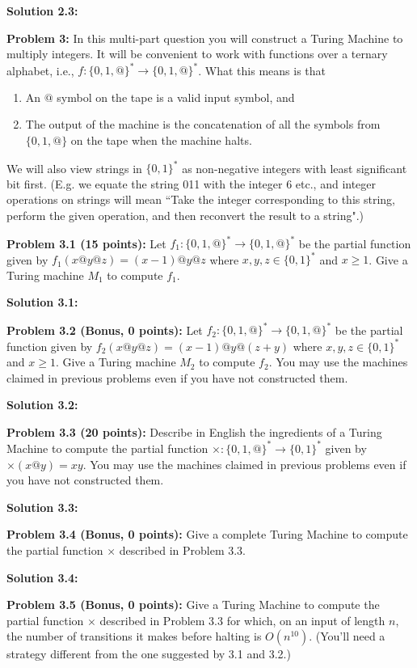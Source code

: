 \documentclass[11pt]{article}
\begin{document}
\textbf{Solution 2.3:} 


\textbf{Problem 3:} In this multi-part question you will construct a Turing Machine to multiply integers. It will be convenient to work with functions over a ternary alphabet, i.e., $f:\{0,1,@\}^* \to  \{0,1,@\}^*$. What this means is that
\begin{enumerate}
\item An $@$ symbol on the tape is a valid input symbol, and 
\item The output of the machine is the concatenation of all the symbols from $\{0,1,@\}$ on the tape when the machine halts. 
\end{enumerate}
We will also view strings in $\{0,1\}^*$ as non-negative integers with least significant bit first. (E.g. we equate the string 011 with the integer 6 etc., and integer operations on strings will mean ``Take the integer corresponding to this string, perform the given operation, and then reconvert the result to a string".)

\textbf{Problem 3.1 (15 points):} Let $f_1:\{0,1,@\}^* \to  \{0,1,@\}^*$ be the partial function given by $f_1(x@y@z) = (x-1) @ y @ z$ where $x,y,z \in \{0,1\}^*$ and $x \ge 1$. Give a Turing machine $M_1$ to compute $f_1$.

\textbf{Solution 3.1:} 

\textbf{Problem 3.2 (Bonus, 0 points):} Let $f_2:\{0,1,@\}^* \to  \{0,1,@\}^*$ be the partial function given by $f_2(x@y@z) = (x-1) @ y @ (z + y)$ where $x,y,z\in \{0,1\}^*$ and $x \ge 1$. Give a Turing machine $M_2$ to compute $f_2$. You may use the machines claimed in previous problems even if you have not constructed them. 

\textbf{Solution 3.2:} 

\textbf{Problem 3.3 (20 points):} Describe in English the ingredients of a Turing Machine to compute the partial function $\times:\{0,1,@\}^* \to  \{0,1\}^*$ given by $\times(x @ y) = xy$. You may use the machines claimed in previous problems even if you have not constructed them. 

\textbf{Solution 3.3:} 

\textbf{Problem 3.4 (Bonus, 0 points):} Give a complete Turing Machine to compute the partial function $\times$ described in Problem 3.3.

\textbf{Solution 3.4:} 

\pagebreak 

\textbf{Problem 3.5 (Bonus, 0 points):} Give a Turing Machine to compute the partial function $\times$ described in Problem 3.3 for which, on an input of length $n$, the number of transitions it makes before halting is $O(n^{10})$. (You'll need a strategy different from the one suggested by 3.1 and 3.2.)
\end{document}
